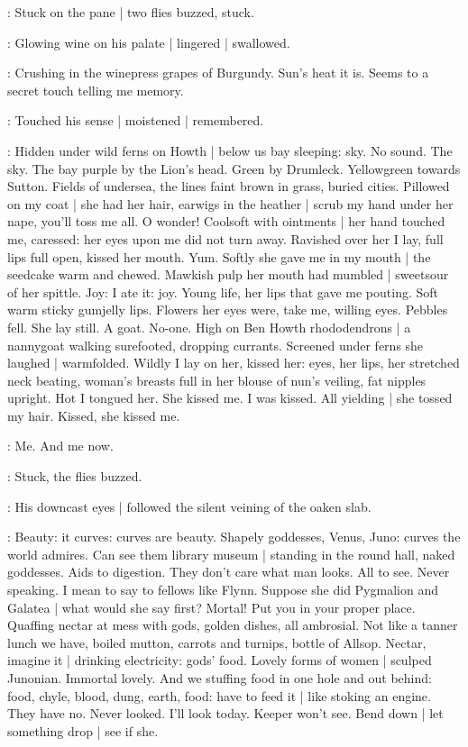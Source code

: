 :
Stuck on the pane |
two flies buzzed,
stuck.

:
Glowing wine on his palate |
lingered |
swallowed.

\BloomInt:
Crushing in the winepress grapes of Burgundy.
Sun's heat it is.
Seems to a secret touch telling me memory.

:
Touched his sense |
moistened |
remembered.

\BloomInt:
Hidden under wild ferns on Howth |
below us bay sleeping:
sky.
No sound.
The sky.
The bay purple by the Lion's head.
Green by Drumleck.
Yellowgreen towards Sutton.
Fields of undersea,
the lines faint brown in grass,
buried cities.
Pillowed on my coat |
she had her hair,
earwigs in the heather |
scrub my hand under her nape,
you'll toss me all.
O wonder!
Coolsoft with ointments |
her hand touched me,
caressed:
her eyes upon me did not turn away.
Ravished over her I lay,
full lips full open,
kissed her mouth.
Yum.
Softly she gave me in my mouth |
the seedcake warm and chewed.
Mawkish pulp her mouth had mumbled |
sweetsour of her spittle.
Joy:
I ate it:
joy.
Young life,
her lips that gave me pouting.
Soft warm sticky gumjelly lips.
Flowers her eyes were,
take me,
willing eyes.
Pebbles fell.
She lay still.
A goat.
No-one.
High on Ben Howth rhododendrons |
a nannygoat walking surefooted, dropping currants.
Screened under ferns she laughed |
warmfolded.
Wildly I lay on her,
kissed her:
eyes, her lips,
her stretched neck beating,
woman's breasts full in her blouse of nun's veiling,
fat nipples upright.
Hot I tongued her.
She kissed me.
I was kissed.
All yielding |
she tossed
my hair.
Kissed, she kissed me.

\BloomInt:
Me.
And me now.

:
Stuck,
the flies buzzed.

:
His downcast eyes |
followed the silent veining of the oaken slab.

\BloomInt:
Beauty:
it curves:
curves are beauty.
Shapely goddesses,
Venus, Juno:
curves the world admires.
Can see them library museum |
standing in the round hall,
naked goddesses.
Aids to digestion.
They don't care what man looks.
All to see.
Never speaking.
I mean to say to fellows like Flynn.
Suppose she did Pygmalion and Galatea |
what would she say first?
Mortal!
Put you in your proper place.
Quaffing nectar at mess with gods,
golden dishes,
all ambrosial.
Not like a tanner lunch we have,
boiled mutton,
carrots and turnips,
bottle of Allsop.
Nectar, imagine it |
drinking electricity:
gods' food.
Lovely forms of women |
sculped Junonian.
Immortal lovely.
And we stuffing food in one hole and out behind:
food, chyle, blood, dung, earth, food:
have to feed it |
like stoking an engine.
They have no.
Never looked.
I'll look today.
Keeper won't see.
Bend down |
let something drop |
see if she.

